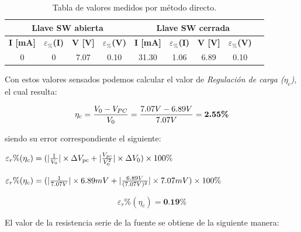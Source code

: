 \documentclass{article}
\begin{document}
\begin{table}[!hbt]
	\begin{center}

		\begin{tabular}{|c|c|c|c|c|c|c|c|c|} \hline
			\multicolumn{4}{|c|}{\textbf{Llave SW abierta}} & \multicolumn{4}{c|}{\textbf{Llave SW cerrada}} \\ \hline
			\textbf{I [mA]} & \textbf{$\varepsilon_{\%}$(I)} & \textbf{V [V]} & \textbf{$\varepsilon_{\%}$(V)} & \textbf{I [mA]} & \textbf{$\varepsilon_{\%}$(I)} & \textbf{V [V]} & \textbf{$\varepsilon_{\%}$(V)} \\\cline{1-8}
			0 & 0 & 7.07 & 0.10 & 31.30 & 1.06 & 6.89 & 0.10 \\\cline{1-8}
		\end{tabular}

	\caption{Tabla de valores medidos por método directo.}
	\end{center}
\end{table}
\bigskip



Con estos valores sensados podemos calcular el valor de \textit{Regulación de carga ($\eta_c$)}, el cual resulta:
\bigskip

\begin{equation}
 	\eta_c = {V_0 - V_{PC} \over V_0} = {7.07V - 6.89V \over 7.07V} = \textbf{2.55\%}
\end{equation}
\bigskip


\newpage
\noindent siendo su error correspondiente el siguiente:
\bigskip

\begin{center}
	$\varepsilon_r\%(\eta_c) = (|{1 \over V_{0}}| \times \Delta V_{pc} + |{V_{pc} \over V_{0}^2}| \times \Delta V_{0})\times 100\% $ \\
\end{center}

\begin{center}
	$\varepsilon_r\%(\eta_c) = (|{1 \over 7.07V}| \times 6.89mV + |{6.89V \over (7.07V)^2}| \times 7.07mV)\times 100\%$ \\
\end{center}

\begin{equation}
	\varepsilon_r\%(\eta_c) = \textbf{0.19\%}
\end{equation}

\bigskip\bigskip


\noindent El valor de la resistencia serie de la fuente se obtiene de la siguiente manera:
\bigskip
\end{document}

